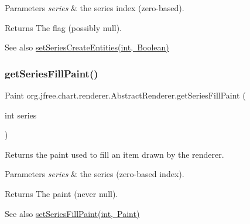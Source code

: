 \begin{DoxyParams}{Parameters}
{\em series} & the series index (zero-\/based).\\
\hline
\end{DoxyParams}
\begin{DoxyReturn}{Returns}
The flag (possibly {\ttfamily null}).
\end{DoxyReturn}
\begin{DoxySeeAlso}{See also}
\mbox{\hyperlink{classorg_1_1jfree_1_1chart_1_1renderer_1_1_abstract_renderer_a2e6b07a8f5a71906f27d40c5bfa0ed54}{set\+Series\+Create\+Entities(int, Boolean)}} 
\end{DoxySeeAlso}
\mbox{\label{classorg_1_1jfree_1_1chart_1_1renderer_1_1_abstract_renderer_abe494da598ffcdb6526ff6d4342001ce}} 
\subsubsection{\texorpdfstring{get\+Series\+Fill\+Paint()}{getSeriesFillPaint()}}
{\footnotesize\ttfamily Paint org.\+jfree.\+chart.\+renderer.\+Abstract\+Renderer.\+get\+Series\+Fill\+Paint (\begin{DoxyParamCaption}\item[{int}]{series }\end{DoxyParamCaption})}

Returns the paint used to fill an item drawn by the renderer.


\begin{DoxyParams}{Parameters}
{\em series} & the series (zero-\/based index).\\
\hline
\end{DoxyParams}
\begin{DoxyReturn}{Returns}
The paint (never {\ttfamily null}).
\end{DoxyReturn}
\begin{DoxySeeAlso}{See also}
\mbox{\hyperlink{classorg_1_1jfree_1_1chart_1_1renderer_1_1_abstract_renderer_a58d6e005c9296bacaf29e2cfea8b58b7}{set\+Series\+Fill\+Paint(int, Paint)}} 
\end{DoxySeeAlso}
\mbox{\label{classorg_1_1jfree_1_1chart_1_1renderer_1_1_abstract_renderer_a541c5cf27a5e10f32716f802b7e6a392}} 
